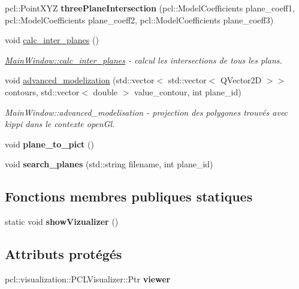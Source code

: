 \begin{DoxyCompactItemize}
\mbox{\label{classMainWindow_ac50b2af26b94eb93ca707e25057e6a8f}} 
pcl\+::\+Point\+X\+YZ {\bfseries three\+Plane\+Intersection} (pcl\+::\+Model\+Coefficients plane\+\_\+coeff1, pcl\+::\+Model\+Coefficients plane\+\_\+coeff2, pcl\+::\+Model\+Coefficients plane\+\_\+coeff3)
\item 
void \hyperlink{classMainWindow_a94ae96c49d6c349e19632d9639926029}{calc\+\_\+inter\+\_\+planes} ()
\begin{DoxyCompactList}\small\item\em \hyperlink{classMainWindow_a94ae96c49d6c349e19632d9639926029}{Main\+Window\+::calc\+\_\+inter\+\_\+planes} -\/ calcul les intersections de tous les plans. \end{DoxyCompactList}\item 
void \hyperlink{classMainWindow_a007d96d06719323cefdf2911a27be390}{advanced\+\_\+modelization} (std\+::vector$<$ std\+::vector$<$ Q\+Vector2D $>$$>$ contours, std\+::vector$<$ double $>$ value\+\_\+contour, int plane\+\_\+id)
\begin{DoxyCompactList}\small\item\em Main\+Window\+::advanced\+\_\+modelisation -\/ projection des polygones trouvés avec kippi dans le contexte open\+Gl. \end{DoxyCompactList}\item 
\mbox{\label{classMainWindow_a6babcc4794e60b38ca505e29dd4edb5d}} 
void {\bfseries plane\+\_\+to\+\_\+pict} ()
\item 
\mbox{\label{classMainWindow_ac8645de6863dba9f6ab989cb0b969cbe}} 
void {\bfseries search\+\_\+planes} (std\+::string filename, int plane\+\_\+id)
\end{DoxyCompactItemize}
\subsection*{Fonctions membres publiques statiques}
\begin{DoxyCompactItemize}
\item 
\mbox{\label{classMainWindow_a75f9b462219b1b22bad10c3d61d4d032}} 
static void {\bfseries show\+Vizualizer} ()
\end{DoxyCompactItemize}
\subsection*{Attributs protégés}
\begin{DoxyCompactItemize}
\item 
\mbox{\label{classMainWindow_a025f68d3c8f83a5e3735ae159ff96f08}} 
pcl\+::visualization\+::\+P\+C\+L\+Visualizer\+::\+Ptr {\bfseries viewer}
\end{DoxyCompactItemize}
